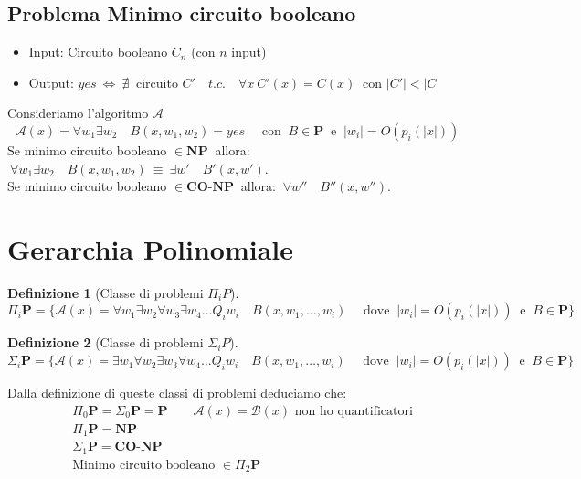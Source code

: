 \documentclass[a4paper]{article}
\theoremstyle{definition}
\newtheorem{definit}{Definizione}[subsection]
\newcommand{\p}{\mathbf{P}}
\newcommand{\np}{\mathbf{NP}}
\newcommand{\conp}{\mathbf{CO}\text{-}\mathbf{NP}}
\newcommand{\alg}[1]{\mathcal{#1}}
\begin{document}
	 \subsection{Problema Minimo circuito booleano}
		 \begin{itemize}
		 	\item Input: Circuito booleano $ C_n $ (con $ n $ input)
		 	\item Output: $ yes \ \Leftrightarrow \ \nexists \ $ circuito $ C' \quad t.c.\quad \forall x \ C'(x) = C(x) \ $ con  $ \vert C'\vert < \vert C \vert $ 
		 \end{itemize}
		 Consideriamo l'algoritmo $ \alg{A} $
		\[
			\alg{A}(x) = \forall w_1 \exists w_2 \quad B(x, w_1, w_2) = yes \quad \text{ con }\ B\in \p \
			\text{ e } \ \vert w_i \vert = O(p_i(\vert x \vert))
		\]
		Se minimo circuito booleano $ \in \np \ $ allora: $ \ \forall w_1 \exists w_2 \quad B(x, w_1, w_2) \ \equiv \ 
		\exists w'\quad B'(x, w') $.\\
		Se minimo circuito booleano $ \in \conp \ $ allora: $\ \forall w''\quad B''(x, w'') $.
		
	\section{Gerarchia Polinomiale}
		\begin{definit}[Classe di problemi $ \Pi_i P $]
			\[
				\Pi_i \p = \{ \alg{A}(x) = \forall w_1\exists w_2 \forall w_3 \exists w_4 \dots Q_i w_i \quad B(x, w_1, \dots, w_i) \quad \text{ dove } \ \vert w_i \vert = O(p_i(\vert x \vert)) \ \text{ e } \ B\in\p \}
			\]
		\end{definit}
		
		\begin{definit}[Classe di problemi $ \Sigma_i P $]
			\[
			\Sigma_i \p = \{ \alg{A}(x) = \exists w_1\forall w_2 \exists w_3 \forall w_4 \dots Q_i w_i \quad B(x, w_1, \dots, w_i) \quad \text{ dove } \ \vert w_i \vert = O(p_i(\vert x \vert)) \ \text{ e } \ B\in\p \}
			\]
		\end{definit}
		Dalla definizione di queste classi di problemi deduciamo che:
		\begin{align*}
			&\Pi_0 \p = \Sigma_0 \p = \p \qquad \alg{A}(x) = \alg{B}(x) \text{ non ho quantificatori} \\
			&\Pi_1 \p = \np \\
			&\Sigma_1 \p = \conp \\
			&\text{Minimo circuito booleano } \in \Pi_2 \p
		\end{align*}
		
\end{document}

